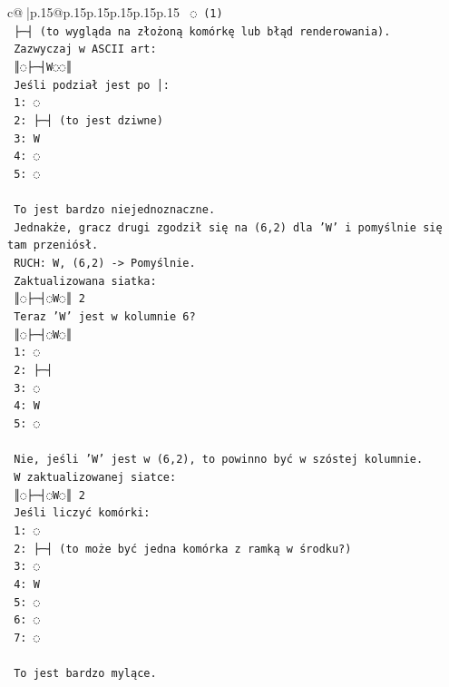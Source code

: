\documentclass{article}
\begin{document}
{\begin{supertabular}{c@{$\;$}|p{.15\linewidth}@{}p{.15\linewidth}p{.15\linewidth}p{.15\linewidth}p{.15\linewidth}p{.15\linewidth}}
{{{\texttt{   ◌ (1)} \\
\texttt{   ├─┤ (to wygląda na złożoną komórkę lub błąd renderowania).} \\
\texttt{   Zazwyczaj w ASCII art:} \\
\texttt{   ║◌├─┤W◌◌║} \\
\texttt{   Jeśli podział jest po │:} \\
\texttt{   1: ◌} \\
\texttt{   2: ├─┤ (to jest dziwne)} \\
\texttt{   3: W} \\
\texttt{   4: ◌} \\
\texttt{   5: ◌} \\
\\ 
\texttt{   To jest bardzo niejednoznaczne.} \\
\texttt{   Jednakże, gracz drugi zgodził się na (6,2) dla 'W' i pomyślnie się tam przeniósł.} \\
\texttt{   RUCH: W, (6,2) {-}> Pomyślnie.} \\
\texttt{   Zaktualizowana siatka:} \\
\texttt{   ║◌├─┤◌W◌║ 2} \\
\texttt{   Teraz 'W' jest w kolumnie 6?} \\
\texttt{   ║◌├─┤◌W◌║} \\
\texttt{   1: ◌} \\
\texttt{   2: ├─┤} \\
\texttt{   3: ◌} \\
\texttt{   4: W} \\
\texttt{   5: ◌} \\
\\ 
\texttt{   Nie, jeśli 'W' jest w (6,2), to powinno być w szóstej kolumnie.} \\
\texttt{   W zaktualizowanej siatce:} \\
\texttt{   ║◌├─┤◌W◌║ 2} \\
\texttt{   Jeśli liczyć komórki:} \\
\texttt{   1: ◌} \\
\texttt{   2: ├─┤ (to może być jedna komórka z ramką w środku?)} \\
\texttt{   3: ◌} \\
\texttt{   4: W} \\
\texttt{   5: ◌} \\
\texttt{   6: ◌} \\
\texttt{   7: ◌} \\
\\ 
\texttt{   To jest bardzo mylące.} \\
}}}
\end{supertabular}}
\end{document}

